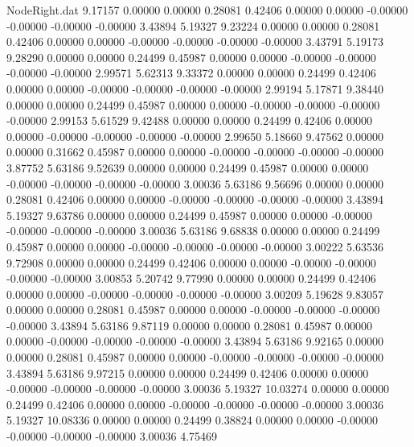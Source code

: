 \begin{filecontents}{NodeRight.dat}
   9.17157    0.00000    0.00000     0.28081    0.42406    0.00000    0.00000   -0.00000   -0.00000   -0.00000   -0.00000    3.43894    5.19327
   9.23224    0.00000    0.00000     0.28081    0.42406    0.00000    0.00000   -0.00000   -0.00000   -0.00000   -0.00000    3.43791    5.19173
   9.28290    0.00000    0.00000     0.24499    0.45987    0.00000    0.00000   -0.00000   -0.00000   -0.00000   -0.00000    2.99571    5.62313
   9.33372    0.00000    0.00000     0.24499    0.42406    0.00000    0.00000   -0.00000   -0.00000   -0.00000   -0.00000    2.99194    5.17871
   9.38440    0.00000    0.00000     0.24499    0.45987    0.00000    0.00000   -0.00000   -0.00000   -0.00000   -0.00000    2.99153    5.61529
   9.42488    0.00000    0.00000     0.24499    0.42406    0.00000    0.00000   -0.00000   -0.00000   -0.00000   -0.00000    2.99650    5.18660
   9.47562    0.00000    0.00000     0.31662    0.45987    0.00000    0.00000   -0.00000   -0.00000   -0.00000   -0.00000    3.87752    5.63186
   9.52639    0.00000    0.00000     0.24499    0.45987    0.00000    0.00000   -0.00000   -0.00000   -0.00000   -0.00000    3.00036    5.63186
   9.56696    0.00000    0.00000     0.28081    0.42406    0.00000    0.00000   -0.00000   -0.00000   -0.00000   -0.00000    3.43894    5.19327
   9.63786    0.00000    0.00000     0.24499    0.45987    0.00000    0.00000   -0.00000   -0.00000   -0.00000   -0.00000    3.00036    5.63186
   9.68838    0.00000    0.00000     0.24499    0.45987    0.00000    0.00000   -0.00000   -0.00000   -0.00000   -0.00000    3.00222    5.63536
   9.72908    0.00000    0.00000     0.24499    0.42406    0.00000    0.00000   -0.00000   -0.00000   -0.00000   -0.00000    3.00853    5.20742
   9.77990    0.00000    0.00000     0.24499    0.42406    0.00000    0.00000   -0.00000   -0.00000   -0.00000   -0.00000    3.00209    5.19628
   9.83057    0.00000    0.00000     0.28081    0.45987    0.00000    0.00000   -0.00000   -0.00000   -0.00000   -0.00000    3.43894    5.63186
   9.87119    0.00000    0.00000     0.28081    0.45987    0.00000    0.00000   -0.00000   -0.00000   -0.00000   -0.00000    3.43894    5.63186
   9.92165    0.00000    0.00000     0.28081    0.45987    0.00000    0.00000   -0.00000   -0.00000   -0.00000   -0.00000    3.43894    5.63186
   9.97215    0.00000    0.00000     0.24499    0.42406    0.00000    0.00000   -0.00000   -0.00000   -0.00000   -0.00000    3.00036    5.19327
  10.03274    0.00000    0.00000     0.24499    0.42406    0.00000    0.00000   -0.00000   -0.00000   -0.00000   -0.00000    3.00036    5.19327
  10.08336    0.00000    0.00000     0.24499    0.38824    0.00000    0.00000   -0.00000   -0.00000   -0.00000   -0.00000    3.00036    4.75469

\end{filecontents}

